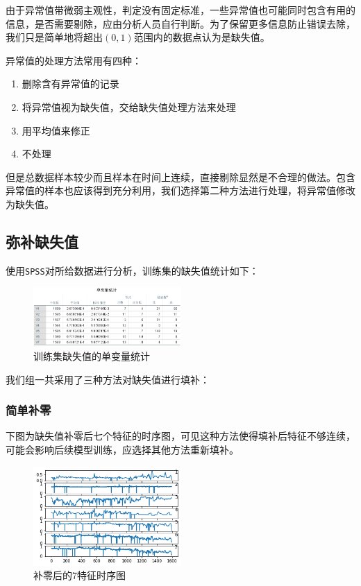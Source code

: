 \documentclass[11pt,a4paper]{elegantpaper}
\begin{document}
\begin{multicols}{2}
由于异常值带微弱主观性，判定没有固定标准，一些异常值也可能同时包含有用的信息，是否需要剔除，应由分析人员自行判断。为了保留更多信息防止错误去除，我们只是简单地将超出$(0,1)$范围内的数据点认为是缺失值。

异常值的处理方法常用有四种：

\begin{enumerate}
  \item 删除含有异常值的记录
  \item 将异常值视为缺失值，交给缺失值处理方法来处理
  \item 用平均值来修正
  \item 不处理
\end{enumerate}

但是总数据样本较少而且样本在时间上连续，直接剔除显然是不合理的做法。包含异常值的样本也应该得到充分利用，我们选择第二种方法进行处理，将异常值修改为缺失值。


\subsection{弥补缺失值}

使用\lstinline{SPSS}对所给数据进行分析，训练集的缺失值统计如下：

\begin{figure}[H]
  \centering
  \includegraphics[width=0.5\textwidth]{images/QQQ.png}
  \caption{训练集缺失值的单变量统计}
\end{figure}

我们组一共采用了三种方法对缺失值进行填补：

\subsubsection{简单补零}

下图为缺失值补零后七个特征的时序图，可见这种方法使得填补后特征不够连续，可能会影响后续模型训练，应选择其他方法重新填补。

\begin{figure}[H]
  \centering
  \includegraphics[width=0.5\textwidth]{images/ZERO.png}
  \caption{补零后的7特征时序图}
\end{figure}


\end{multicols}
\end{document}
